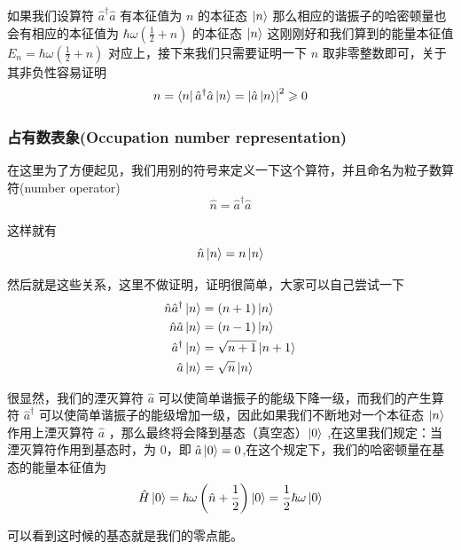 \documentclass{article}
\begin{document}
如果我们设算符 $\hat{a}^\dagger \hat{a}$ 有本征值为 $n$ 的本征态 $\ket{n}$ 那么相应的谐振子的哈密顿量也会有相应的本征值为 $\hbar \omega \left(\frac{1}{2} + n\right)$ 的本征态 $\ket{n}$ 这刚刚好和我们算到的能量本征值 $E_n = \hbar \omega \left(\frac{1}{2} + n\right)$ 对应上，接下来我们只需要证明一下 $n$ 取非零整数即可，关于其非负性容易证明
\begin{equation*}
    n = \bra{n}\hat{a}^\dagger\hat{a}\ket{n} = \left|\hat{a}\ket{n}\right|^2 \geqslant  0
\end{equation*}


\subsubsection{占有数表象(Occupation number representation)}

在这里为了方便起见，我们用别的符号来定义一下这个算符，并且命名为粒子数算符(number operator)
\begin{equation*}
    \hat{n} = \hat{a}^\dagger \hat{a}
\end{equation*}


这样就有
\begin{equation*}
    \hat{n}\ket{n} = n\ket{n}
\end{equation*}


然后就是这些关系，这里不做证明，证明很简单，大家可以自己尝试一下
\begin{align*}
    \hat{n}\hat{a}^\dagger\ket{n} &= \left(n + 1\right) \ket{n} \\
    \hat{n}\hat{a}\ket{n} &= \left(n - 1\right) \ket{n} \\
    \hat{a}^\dagger \ket{n} &= \sqrt{n + 1}\ket{n + 1} \\
    \hat{a} \ket{n} &= \sqrt{n} \ket{n}
\end{align*}

很显然，我们的湮灭算符 $\hat{a}$ 可以使简单谐振子的能级下降一级，而我们的产生算符 $\hat{a}^\dagger$ 可以使简单谐振子的能级增加一级，因此如果我们不断地对一个本征态 $\ket{n}$ 作用上湮灭算符 $\hat{a}$ ，那么最终将会降到基态（真空态）$\ket{0}$ ,在这里我们规定：当湮灭算符作用到基态时，为 $0$，即 $\displaystyle \hat{a}\ket{0} = 0$,在这个规定下，我们的哈密顿量在基态的能量本征值为
\begin{equation*}
    \hat{H} \ket{0} = \hbar\omega \left(\hat{n} + \frac{1}{2}\right) \ket{0} = \frac{1}{2}\hbar\omega \ket{0}
\end{equation*}

可以看到这时候的基态就是我们的零点能。
\end{document}
